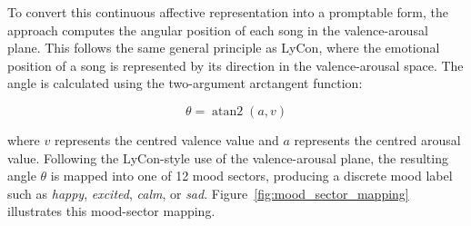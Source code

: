 To convert this continuous affective representation into a promptable form, the approach computes the angular position of each song in the valence-arousal plane. This follows the same general principle as LyCon, where the emotional position of a song is represented by its direction in the valence-arousal space. The angle is calculated using the two-argument arctangent function:

\[
\theta = \operatorname{atan2}(a, v)
\]

where \(v\) represents the centred valence value and \(a\) represents the centred arousal value. Following the LyCon-style use of the valence-arousal plane, the resulting angle \(\theta\) is mapped into one of 12 mood sectors, producing a discrete mood label such as \textit{happy}, \textit{excited}, \textit{calm}, or \textit{sad}. Figure~\ref{fig:mood_sector_mapping} illustrates this mood-sector mapping.

